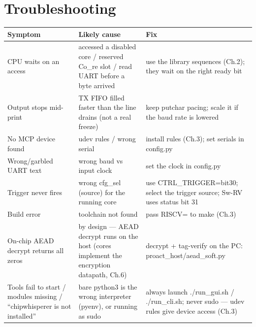 \documentclass[11pt,a4paper]{report}
\newcommand{\code}[1]{{\ttfamily\small #1}}
\begin{document}
\chapter{Troubleshooting}
\begin{center}
\begin{longtable}{p{4.6cm}p{4.6cm}p{4.4cm}}
\toprule
Symptom & Likely cause & Fix \\ \midrule\endhead
CPU waits on an access & accessed a disabled core / reserved \code{Co\_re} slot / read UART before a byte arrived & use the library sequences (Ch.2); they wait on the right ready bit \\
Output stops mid-print & TX FIFO filled faster than the line drains (not a real freeze) & keep \code{putchar} pacing; scale it if the baud rate is lowered \\
No MCP device found & udev rules / wrong serial & install rules (Ch.3); set serials in \code{config.py} \\
Wrong/garbled UART text & wrong baud vs input clock & set the clock in \code{config.py} \\
Trigger never fires & wrong \code{cfg\_sel} (source) for the running core & use \code{CTRL\_TRIGGER}=bit30; select the trigger source; Sw-RV uses status bit 31 \\
Build error & toolchain not found & pass \code{RISCV=} to make (Ch.3) \\
On-chip AEAD decrypt returns all zeros & by design --- AEAD decrypt runs on the host (cores implement the encryption datapath, Ch.6) & decrypt + tag-verify on the PC: \code{proact\_host/aead\_soft.py} \\
Tools fail to start / modules missing / ``chipwhisperer is not installed'' & bare \code{python3} is the wrong interpreter (pyenv), or running as \code{sudo} & always launch \code{./run\_gui.sh} / \code{./run\_cli.sh}; never \code{sudo} --- udev rules give device access (Ch.3) \\
\bottomrule
\end{longtable}\end{center}

\appendix
\end{document}
